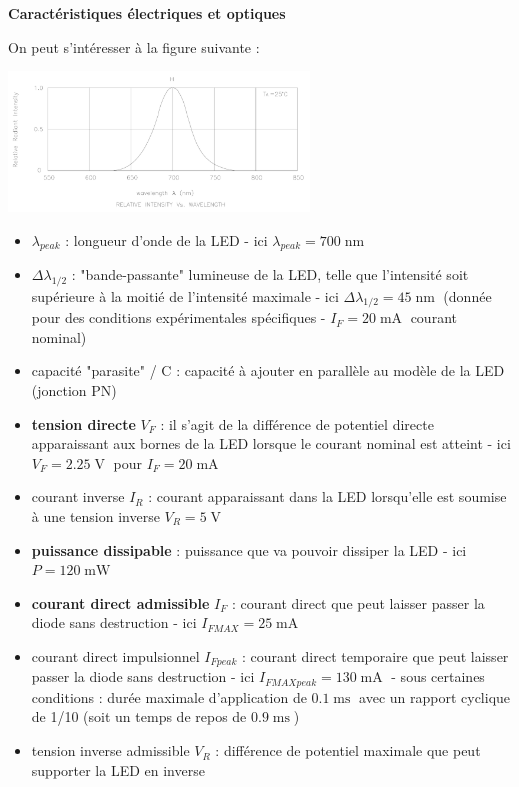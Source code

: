 \documentclass[a4paper,french]{paper}
\begin{document}
\textbf{\large Caractéristiques électriques et optiques}

On peut s'intéresser à la figure suivante : 

\begin{center}
	\includegraphics[width=8cm]{images/TD/caract_001_c_cor.png}
\end{center}

\begin{itemize}
	\item \textbf{$\lambda{}_{peak}$} : longueur d'onde de la LED - ici $\lambda{}_{peak} = 700\operatorname{nm}$
	\item $\Delta\lambda{}_{1/2}$ : "bande-passante" lumineuse de la LED, telle que l'intensité soit supérieure à la moitié de l'intensité maximale - ici $\Delta\lambda{}_{1/2} = 45\operatorname{nm}$ (donnée pour des conditions expérimentales spécifiques - $I_F = 20\operatorname{mA}$ courant nominal)
	\item capacité "parasite" / C : capacité à ajouter en parallèle au modèle de la LED (jonction PN)
	\item \textbf{tension directe} $V_F$ : il s'agit de la différence de potentiel directe apparaissant aux bornes de la LED lorsque le courant nominal est atteint - ici $V_F = 2.25\operatorname{V}$ pour $I_F = 20\operatorname{mA}$
	\item courant inverse $I_R$ : courant apparaissant dans la LED lorsqu'elle est soumise à une tension inverse $V_R = 5\operatorname{V}$
	
	\item \textbf{puissance dissipable} : puissance que va pouvoir dissiper la LED - ici $P = 120\operatorname{mW}$
	\item \textbf{courant direct admissible} $I_F$ : courant direct que peut laisser passer la diode sans destruction - ici $I_{FMAX} = 25\operatorname{mA}$
	\item courant direct impulsionnel $I_{Fpeak}$ : courant direct temporaire que peut laisser passer la diode sans destruction - ici $I_{FMAXpeak} = 130\operatorname{mA}$ - sous certaines conditions : durée maximale d'application de $0.1\operatorname{ms}$ avec un rapport cyclique de 1/10 (soit un temps de repos de $0.9\operatorname{ms}$)
	\item tension inverse admissible $V_R$ : différence de potentiel maximale que peut supporter la LED en inverse
\end{itemize}
\end{document}
